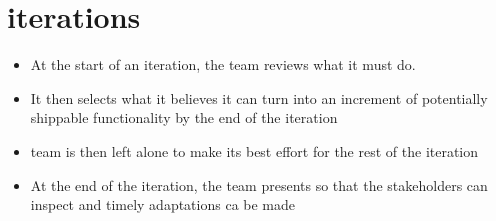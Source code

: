 \section{iterations}

\begin{itemize}
  \item At the start of an iteration, the team reviews what it must do. 
  \item It then selects what it believes it can turn into an increment of potentially shippable functionality by the end of the iteration
  \item team is then left alone to make its best effort for the rest of the iteration
  \item At the end of the iteration, the team presents so that the stakeholders can inspect and timely adaptations ca be made
\end{itemize}
